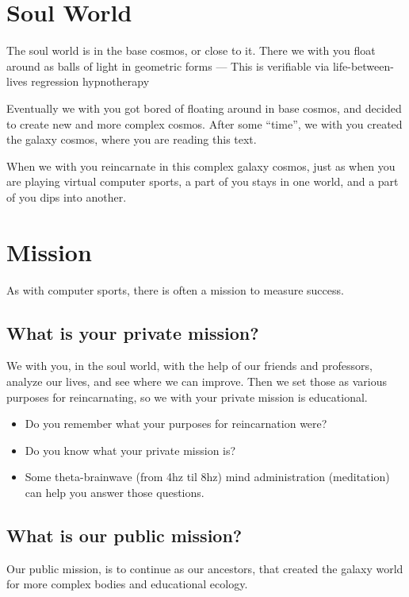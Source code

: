 \documentclass{report}
\begin{document}
\section{Soul World}
\label{soulWorld}

The soul world is in the base cosmos, or close to it.
There we with you float around as balls of light in geometric forms ---
This is verifiable via life-between-lives regression
hypnotherapy\cite{newtins}\cite{newton2000destiny}

Eventually we with you got bored of floating around in base cosmos,
and decided to create new and more complex cosmos.
After some ``time'', we with you created the galaxy cosmos, where you are reading this
text.

When we with you reincarnate in this complex galaxy cosmos, just as when you are 
playing virtual computer sports, a part of you stays in one world, and a part
of you dips into another.

\section{Mission}
\label{mission}

As with computer sports, there is often a mission to measure success.

\subsection{What is your private mission?}

We with you, in the soul world, with the help of our friends and professors,
 analyze our lives, and see where we can improve. Then we set those as various
purposes for reincarnating, so we with your private mission is educational.

\begin{itemize}
\item Do you remember what your purposes for reincarnation were?
\item Do you know what your private mission is?
\item Some theta-brainwave (from 4hz til 8hz) mind administration (meditation) can help you answer those
questions. 
\end{itemize}

\subsection{What is our public mission?}

Our public mission, is to continue as our ancestors, that created the galaxy
world for more complex bodies and educational ecology.  
\end{document}

